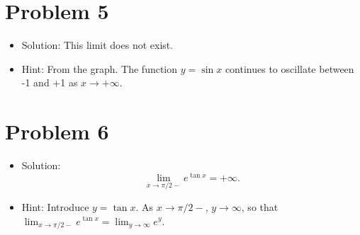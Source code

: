 \documentclass{amsart}
\begin{document}
\section*{Problem 5}

\begin{itemize}
\item Solution: This limit does not exist.
\item Hint: From the graph. The function $y = \sin x$ continues to oscillate between -1 and +1 as $x \to +\infty$.
\end{itemize}


\section*{Problem 6}

\begin{itemize}
\item Solution:
  \[
    \lim_{x \to \pi/2-} e^{\tan x} = +\infty.
  \]
\item Hint: Introduce $y = \tan x$. As $x \to \pi/2-$, $y \to \infty$, so that $\displaystyle \lim_{x \to \pi/2-} e^{\tan x} = \lim_{y \to \infty} e^y$.
\end{itemize}
\end{document}
